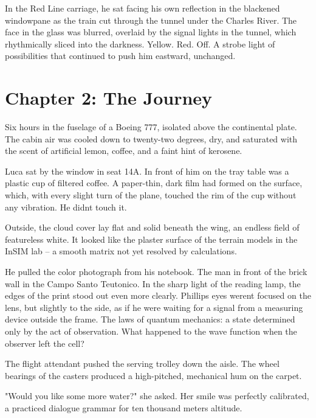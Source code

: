 \documentclass[
  ngerman,
]{article}
\begin{document}
In the Red Line carriage, he sat facing his own reflection in the
blackened windowpane as the train cut through the tunnel under the
Charles River. The face in the glass was blurred, overlaid by the signal
lights in the tunnel, which rhythmically sliced
\hspace{0pt}\hspace{0pt}into the darkness. Yellow. Red. Off. A strobe
light of possibilities that continued to push him eastward, unchanged.

\section{\texorpdfstring{\textbf{Chapter 2: The
Journey}}{Chapter 2: The Journey}}\label{chapter-2-the-journey}

Six hours in the fuselage of a Boeing 777, isolated above the
continental plate. The cabin air was cooled down to twenty-two degrees,
dry, and saturated with the scent of artificial lemon, coffee, and a
faint hint of kerosene.

Luca sat by the window in seat 14A. In front of him on the tray table
was a plastic cup of filtered coffee. A paper-thin, dark film had formed
on the surface, which, with every slight turn of the plane, touched the
rim of the cup without any vibration. He didn\textquotesingle t touch
it.

Outside, the cloud cover lay flat and solid beneath the wing, an endless
field of featureless white. It looked like the plaster surface of the
terrain models in the InSIM lab -- a smooth matrix not yet resolved by
calculations.

He pulled the color photograph from his notebook. The man in front of
the brick wall in the Campo Santo Teutonico. In the sharp light of the
reading lamp, the edges of the print stood out even more clearly.
Phillips\textquotesingle{} eyes weren\textquotesingle t focused on the
lens, but slightly to the side, as if he were waiting for a signal from
a measuring device outside the frame. The laws of quantum mechanics: a
state determined only by the act of observation. What happened to the
wave function when the observer left the cell?

The flight attendant pushed the serving trolley down the aisle. The
wheel bearings of the casters produced a high-pitched, mechanical hum on
the carpet.

"Would you like some more water?" she asked. Her smile was perfectly
calibrated, a practiced dialogue grammar for ten thousand meters
altitude.
\end{document}
